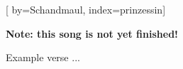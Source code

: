 
[%
    by={Schandmaul},
    index={prinzessin}]


    \label{prinzessin}

    \textbf{Note: this song is not yet finished!}

    \beginverse
        Example verse ...
    \endverse
\endsong

